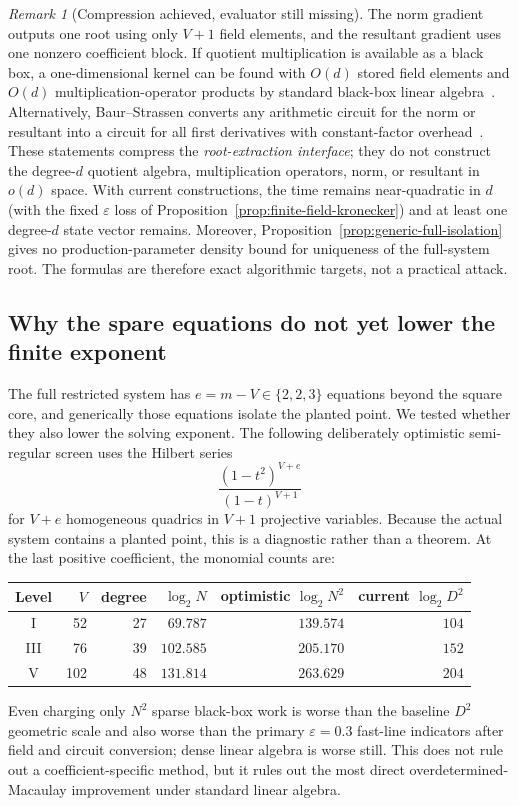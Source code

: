 \documentclass[11pt,a4paper]{article}
\theoremstyle{definition}
\theoremstyle{remark}
\newtheorem{remark}[theorem]{Remark}
\begin{document}
\begin{remark}[Compression achieved, evaluator still missing]\label{rem:implicit-memory}
The norm gradient outputs one root using only $V+1$ field elements, and the resultant gradient uses one nonzero coefficient block.  If quotient multiplication is available as a black box, a one-dimensional kernel can be found with $O(d)$ stored field elements and $O(d)$ multiplication-operator products by standard black-box linear algebra~\cite{Wiedemann}.  Alternatively, Baur--Strassen converts any arithmetic circuit for the norm or resultant into a circuit for all first derivatives with constant-factor overhead~\cite{BaurStrassen}.  These statements compress the \emph{root-extraction interface}; they do not construct the degree-$d$ quotient algebra, multiplication operators, norm, or resultant in $o(d)$ space.  With current constructions, the time remains near-quadratic in $d$ (with the fixed $\varepsilon$ loss of Proposition~\ref{prop:finite-field-kronecker}) and at least one degree-$d$ state vector remains.  Moreover, Proposition~\ref{prop:generic-full-isolation} gives no production-parameter density bound for uniqueness of the full-system root.  The formulas are therefore exact algorithmic targets, not a practical attack.
\end{remark}

\subsection{Why the spare equations do not yet lower the finite exponent}\label{subsec:exponent-audit}

The full restricted system has $e=m-V\in\{2,2,3\}$ equations beyond the square core, and generically those equations isolate the planted point.  We tested whether they also lower the solving exponent.  The following deliberately optimistic semi-regular screen uses the Hilbert series
\[
\frac{(1-t^2)^{V+e}}{(1-t)^{V+1}}
\]
for $V+e$ homogeneous quadrics in $V+1$ projective variables.  Because the actual system contains a planted point, this is a diagnostic rather than a theorem.  At the last positive coefficient, the monomial counts are:
\begin{center}
\small
\begin{tabular}{@{}c r r r r r@{}}
\toprule
Level & $V$ & degree & $\log_2 N$ & optimistic $\log_2N^2$ & current $\log_2D^2$\\
\midrule
I   &52  &27 &$69.787$  &$139.574$ &$104$\\
III &76  &39 &$102.585$ &$205.170$ &$152$\\
V   &102 &48 &$131.814$ &$263.629$ &$204$\\
\bottomrule
\end{tabular}
\end{center}
Even charging only $N^2$ sparse black-box work is worse than the baseline $D^2$ geometric scale and also worse than the primary $\varepsilon=0.3$ fast-line indicators after field and circuit conversion; dense linear algebra is worse still.  This does not rule out a coefficient-specific method, but it rules out the most direct overdetermined-Macaulay improvement under standard linear algebra.
\end{document}
